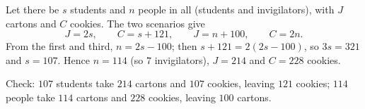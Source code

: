 Let there be $s$ students and $n$ people in all (students and invigilators), with $J$ cartons and $C$ cookies. The two scenarios give
\[
J=2s,\qquad C=s+121,\qquad J=n+100,\qquad C=2n .
\]
From the first and third, $n=2s-100$; then $s+121=2(2s-100)$, so $3s=321$ and $s=107$. Hence $n=114$ (so $7$ invigilators), $J=214$ and $C=\boxed{228}$ cookies.

Check: $107$ students take $214$ cartons and $107$ cookies, leaving $121$ cookies; $114$ people take $114$ cartons and $228$ cookies, leaving $100$ cartons.
